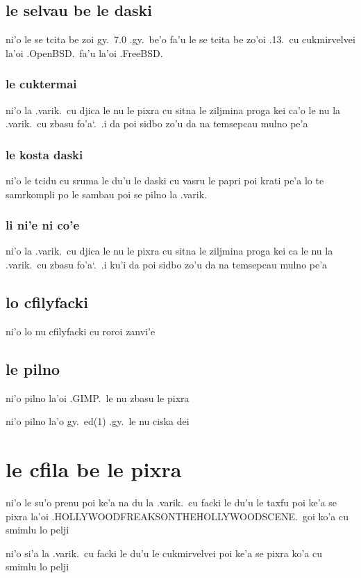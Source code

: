 \documentclass{report}
\newcommand\sds{\spacefactor\sfcode`.\ \space}
\begin{document}
\subsection{le selvau be le daski}
ni'o le se tcita be zoi gy.\ 7.0 .gy.\ be'o fa'u le se tcita be zo'oi .13.\ cu cukmirvelvei la'oi .OpenBSD.\ fa'u la'oi .FreeBSD.

\subsubsection{le cuktermai}
ni'o la .varik.\ cu djica le nu le pixra cu sitna le ziljmina proga kei ca'o le nu la .varik.\ cu zbasu fo'a\sds  .i da poi sidbo zo'u da na temsepcau mulno pe'a

\subsubsection{le kosta daski}
ni'o le tcidu cu sruma le du'u le daski cu vasru le papri poi krati pe'a lo te samrkompli po le sambau poi se pilno la .varik.

\subsubsection{li ni'e ni co'e}
ni'o la .varik.\ cu djica le nu le pixra cu sitna le ziljmina proga kei ca le nu la .varik.\ cu zbasu fo'a\sds  .i ku'i da poi sidbo zo'u da na temsepcau mulno pe'a

\subsection{lo cfilyfacki}
ni'o lo nu cfilyfacki cu roroi zanvi'e

\subsection{le pilno}
ni'o pilno la'oi .GIMP.\ le nu zbasu le pixra

ni'o pilno la'o gy.\ ed(1) .gy.\ le nu ciska dei

\section{le cfila be le pixra}
ni'o le su'o prenu poi ke'a na du la .varik.\ cu facki le du'u le taxfu poi ke'a se pixra la'oi .HOLLYWOODFREAKSONTHEHOLLYWOODSCENE.\ goi ko'a cu smimlu lo pelji

ni'o si'a la .varik.\ cu facki le du'u le cukmirvelvei poi ke'a se pixra ko'a cu smimlu lo pelji
\end{document}
